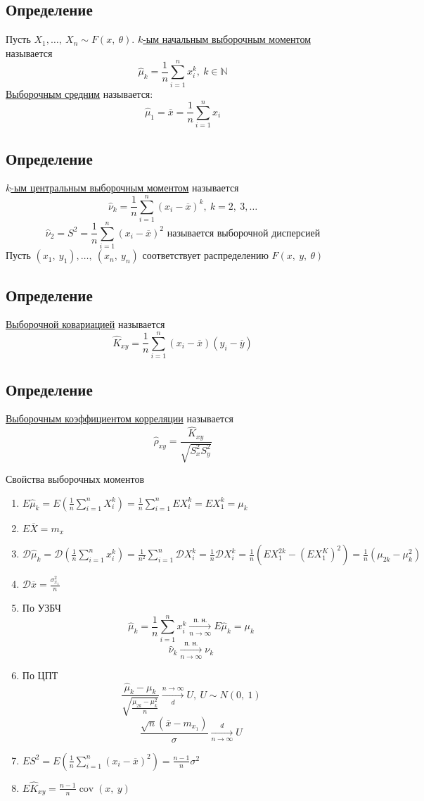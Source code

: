\documentclass[12pt, a4paper]{article}
\newcommand{\cov}{\operatorname{cov}}
\begin{document}
\subsection*{Определение}
Пусть $X_1,\dots,\ X_n \sim F(x,\ \theta)$. \underline{$k$-ым начальным выборочным моментом} называется \[\hat{\mu}_k = \frac{1}{n} \sum_{i = 1}^{n} x_i^k,\ k \in \mathbb{N}\]
\underline{Выборочным средним} называется:
\[\hat{\mu}_1 = \overline{x} = \frac{1}{n} \sum_{i = 1}^{n} x_i\]
\subsection*{Определение}
\underline{$k$-ым центральным выборочным моментом} называется 
\[\hat{\nu}_k = \frac{1}{n} \sum_{i = 1}^{n} (x_i - \overline{x})^k,\ k = 2,\ 3,\dots\]
\[\hat{\nu}_2 = S^2 = \frac{1}{n} \sum_{i = 1}^{n} (x_i - \overline{x})^2 \text{ называется выборочной дисперсией}\]
Пусть $(x_1,\ y_1),\dots,\ (x_n,\ y_n)$ соответствует распределению $F(x,\ y,\ \theta)$
\subsection*{Определение}
\underline{Выборочной ковариацией} называется
\[\hat{K}_{xy} = \frac{1}{n}\sum_{i = 1}^{n} (x_i - \overline{x}) (y_i - \overline{y})\]
\subsection*{Определение}
\underline{Выборочным коэффициентом корреляции} называется 
\[\hat{\rho}_{xy} = \frac{\hat{K}_{xy}}{\sqrt{S_x^2 S_y^2}}\]
\begin{center}
    Свойства выборочных моментов
\end{center}
\begin{enumerate}
    \item $E\hat{\mu}_k = E\left( \frac{1}{n} \sum_{i = 1}^{n} X_i^k \right) = \frac{1}{n} \sum_{i = 1}^{n} E X_i^k = EX_1^k = \mu_k$
    \item $E\overline{X} = m_x$
    \item $\mathcal{D} \hat{\mu}_k = \mathcal{D} \left( \frac{1}{n} \sum_{i = 1}^{n} x_i^k \right) = \frac{1}{n^2} \sum_{i = 1}^{n} \mathcal{D} X_i^k = \frac{1}{n} \mathcal{D} X_i^k = \frac{1}{n} \left( EX_1^{2k} - (EX_1^{K})^2 \right) = \frac{1}{n}(\mu_{2k} - \mu_k^2)$
    \item $\mathcal{D}\overline{x} = \frac{\sigma^2_{x_1}}{n}$
    \item По УЗБЧ
    \[\hat{\mu}_k = \frac{1}{n} \sum_{i = 1}^{n} x_i^k \xrightarrow[n\to \infty]{\text{п. н.}} E\hat{\mu}_k = \mu_k\]
    \[\hat{\nu}_k \xrightarrow[n\to \infty]{\text{п. н.}} \nu_k\]
    \item По ЦПТ
    \[\frac{\hat{\mu}_k - \mu_k}{\sqrt{\frac{\mu_{2k} - \mu_k^2}{n} }}\xrightarrow[d]{n\to\infty}U,\ U\sim N(0,\ 1)\]
    \[\frac{\sqrt{n}(\overline{x} - m_{x_1})}{\sigma} \xrightarrow[n\to\infty]{d} U\]
    \item $ES^2 = E\left( \frac{1}{n} \sum_{i = 1}^{n}(x_i - \overline{x})^2 \right) = \frac{n - 1}{n} \sigma^2$
    \item $E \hat{K}_{xy} = \frac{n - 1}{n} \cov(x,\ y)$
\end{enumerate}
\end{document}
